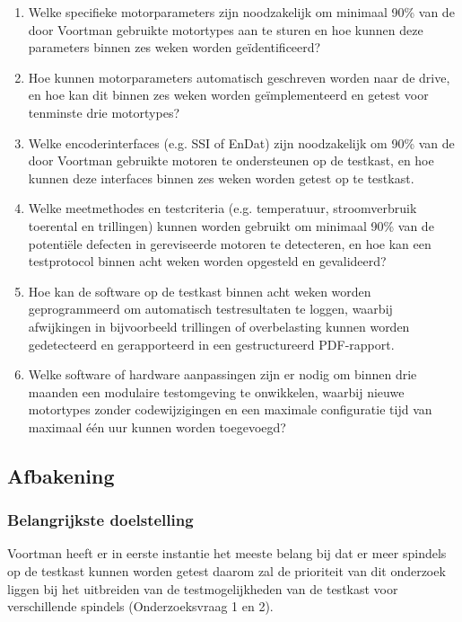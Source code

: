 \begin{enumerate}
	\item Welke specifieke motorparameters zijn noodzakelijk om minimaal 90\% van de door Voortman gebruikte motortypes aan te sturen en hoe kunnen deze parameters binnen zes weken worden geïdentificeerd?
	
	\item Hoe kunnen motorparameters automatisch geschreven worden naar de drive, en hoe kan dit binnen zes weken worden geïmplementeerd en getest voor tenminste drie motortypes?
	
	\item Welke encoderinterfaces (e.g. \gls{SSI} of EnDat) zijn noodzakelijk om 90\% van de door Voortman gebruikte motoren te ondersteunen op de testkast, en hoe kunnen deze interfaces binnen zes weken worden getest op te testkast.
	
	\item Welke meetmethodes en testcriteria (e.g. temperatuur, stroomverbruik toerental en trillingen) kunnen worden gebruikt om minimaal 90\% van de potentiële defecten in gereviseerde motoren te detecteren, en hoe kan een testprotocol binnen acht weken worden opgesteld en gevalideerd?
	
	\item Hoe kan de software op de testkast binnen acht weken worden geprogrammeerd om automatisch testresultaten te loggen, waarbij afwijkingen in bijvoorbeeld trillingen of overbelasting kunnen worden gedetecteerd en gerapporteerd in een gestructureerd \gls{PDF}-rapport.
	
	\item Welke software of hardware aanpassingen zijn er nodig om binnen drie maanden een modulaire testomgeving te onwikkelen, waarbij nieuwe motortypes zonder codewijzigingen en een maximale configuratie tijd van maximaal één uur kunnen worden toegevoegd?
\end{enumerate}

\newpage

\subsection{Afbakening}

\subsubsection{Belangrijkste doelstelling}

Voortman heeft er in eerste instantie het meeste belang bij dat er meer spindels op de testkast kunnen worden getest daarom zal de prioriteit van dit onderzoek liggen bij het uitbreiden van de testmogelijkheden van de testkast voor verschillende spindels (Onderzoeksvraag 1 en 2).

